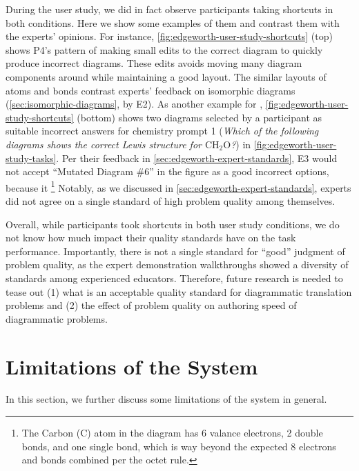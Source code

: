 During the user study, we did in fact observe participants taking shortcuts in both conditions. Here we show some examples of them and contrast them with the experts' opinions. For instance, \cref{fig:edgeworth-user-study-shortcuts} (top) shows P4's pattern of making small edits to the correct diagram to quickly produce incorrect diagrams. These edits avoids moving many diagram components around while maintaining a good layout. The similar layouts of atoms and bonds contrast experts' feedback on isomorphic diagrams (\cref{sec:isomorphic-diagrams}, \eg {} by E2). As another example for \Edgeworth, \cref{fig:edgeworth-user-study-shortcuts} (bottom) shows two diagrams selected by a participant as suitable incorrect answers for chemistry prompt 1 (\textit{Which of the following diagrams shows the correct Lewis structure for \ensuremath{\mathrm{CH_2O}}?}) in \cref{fig:edgeworth-user-study-tasks}. Per their feedback in \cref{sec:edgeworth-expert-standards}, E3 would not accept ``Mutated Diagram \#6'' in the figure as a good incorrect options, because it \footnote{The Carbon (C) atom in the diagram has 6 valance electrons, 2 double bonds, and one single bond, which is way beyond the expected 8 electrons and bonds combined per the octet rule.} Notably, as we discussed in \cref{sec:edgeworth-expert-standards}, experts did not agree on a single standard of high problem quality among themselves. 

Overall, while participants took shortcuts in both user study conditions, we do not know how much impact their quality standards have on the task performance. Importantly, there is not a single standard for ``good'' judgment of problem quality, as the expert demonstration walkthroughs showed a diversity of standards among experienced educators. Therefore, future research is needed to tease out (1) what is an acceptable quality standard for diagrammatic translation problems and (2) the effect of problem quality on authoring speed of diagrammatic problems. 

\section{Limitations of the \Edgeworth System}
\label{sec:limitations}

In this section, we further discuss some limitations of the \Edgeworth system in general.

